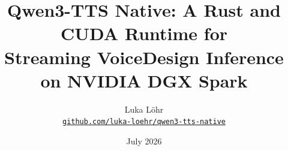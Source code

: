 \documentclass[10pt]{article}
\title{\textbf{Qwen3-TTS Native: A Rust and CUDA Runtime for\\
Streaming VoiceDesign Inference on NVIDIA DGX Spark}}
\author{Luka L\"ohr\\[3pt]
  \small\href{https://github.com/luka-loehr/qwen3-tts-native}{\texttt{github.com/luka-loehr/qwen3-tts-native}}}
\date{July 2026}
\begin{document}
\maketitle

\begin{abstract}

\end{abstract}
















\clearpage
\appendix

\end{document}
